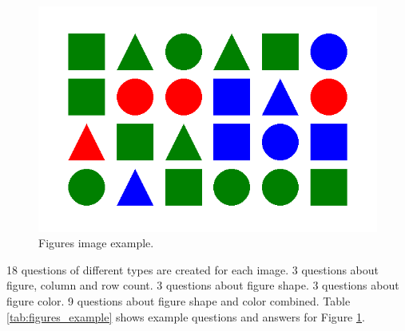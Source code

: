\documentclass[11pt]{article}
\begin{document}
\begin{figure}
    \centering
    \includegraphics[width=\linewidth]{figures_6_4_417148_466526_041585_724774.png}
    \caption{Figures image example.}
    \label{fig:figures_example}
\end{figure}

18 questions of different types are created for each image. 3 questions about figure, column and row count. 3 questions about figure shape. 3 questions about figure color. 9 questions about figure shape and color combined. Table \ref{tab:figures_example} shows example questions and answers for Figure \ref{fig:figures_example}.
\end{document}
